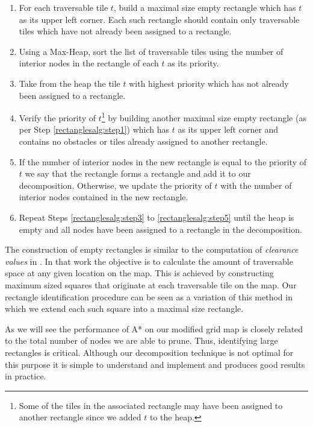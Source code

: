 \begin{enumerate}

\item{\label{rectanglesalg:step1} For each traversable tile $t$, build a maximal size empty
rectangle which has $t$ as its upper left corner. Each such rectangle should contain only
traversable tiles which have not already been assigned to a rectangle.}

\item{\label{rectanglesalg:step2} Using a Max-Heap, sort the list of traversable tiles using the number of
interior nodes in the rectangle of each $t$ as its priority.}

\item{\label{rectanglesalg:step3} Take from the heap the tile $t$ with highest priority
which has not already been assigned to a rectangle. }

\item{\label{rommsalg:step4} Verify the priority of $t$\footnote{Some of the tiles in the associated rectangle
may have been assigned to another rectangle since we added $t$ to the heap.} by building another maximal size
empty rectangle (as per Step \ref{rectanglesalg:step1}) which has $t$ as its upper
left corner and contains no obstacles or tiles already assigned to another rectangle.}

\item{\label{rectanglesalg:step5} If the number of interior nodes in the new rectangle is equal to the 
priority of $t$ we say that the rectangle forms a rectangle and add it to our decomposition. 
Otherwise, we update the priority of $t$ with the number of interior 
nodes contained in the new rectangle. }

\item{\label{rectanglesalg:step6} Repeat Steps \ref{rectanglesalg:step3} to \ref{rectanglesalg:step5} until the heap is
empty and all nodes have been assigned to a rectangle in the decomposition.}

\end{enumerate}

The construction of empty rectangles is similar to the computation of \emph{clearance
values} in \citep{harabor08}.  In that work the objective is to calculate the
amount of traversable space at any given location on the map.  This is achieved
by constructing maximum sized squares that originate at each traversable tile on
the map.  Our rectangle identification procedure can be seen as a variation of this
method in which we extend each such square into a maximal size rectangle.
\par
As we will see the performance of A* on our modified grid map is closely related
to the total number of nodes we are able to prune.  Thus, identifying large
rectangles is critical.  Although our decomposition technique is not optimal for this
purpose it is simple to understand and implement and produces good results in
practice.
